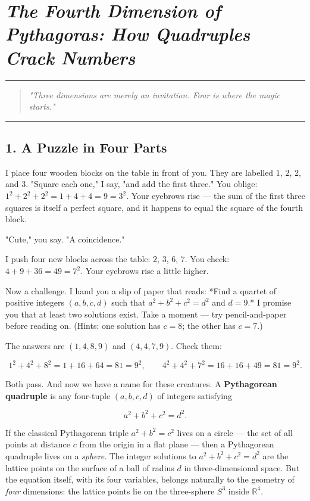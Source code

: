 \documentclass[11pt,openany]{book}
\theoremstyle{definition}
\theoremstyle{plain}
\theoremstyle{remark}
\begin{document}
\clearpage

\chapter{\textit{The Fourth Dimension of Pythagoras: How Quadruples Crack Numbers}}



\bigskip\noindent\rule{\textwidth}{0.4pt}\bigskip


\begin{quote}
\textit{"Three dimensions are merely an invitation. Four is where the magic starts."}
\end{quote}


\bigskip\noindent\rule{\textwidth}{0.4pt}\bigskip


\section{1. A Puzzle in Four Parts}


I place four wooden blocks on the table in front of you. They are labelled $1$, $2$, $2$, and $3$. "Square each one," I say, "and add the first three." You oblige: $1^2 + 2^2 + 2^2 = 1 + 4 + 4 = 9 = 3^2$. Your eyebrows rise — the sum of the first three squares is itself a perfect square, and it happens to equal the square of the fourth block.

"Cute," you say. "A coincidence."

I push four new blocks across the table: $2$, $3$, $6$, $7$. You check: $4 + 9 + 36 = 49 = 7^2$. Your eyebrows rise a little higher.

Now a challenge. I hand you a slip of paper that reads: *Find a quartet of positive integers $(a, b, c, d)$ such that $a^2 + b^2 + c^2 = d^2$ and $d = 9$.* I promise you that at least two solutions exist. Take a moment — try pencil-and-paper before reading on. (Hints: one solution has $c = 8$; the other has $c = 7$.)

The answers are $(1, 4, 8, 9)$ and $(4, 4, 7, 9)$. Check them:

$$1^2 + 4^2 + 8^2 = 1 + 16 + 64 = 81 = 9^2, \qquad 4^2 + 4^2 + 7^2 = 16 + 16 + 49 = 81 = 9^2.$$

Both pass. And now we have a name for these creatures. A \textbf{Pythagorean quadruple} is any four-tuple $(a, b, c, d)$ of integers satisfying

$$a^2 + b^2 + c^2 = d^2.$$

If the classical Pythagorean triple $a^2 + b^2 = c^2$ lives on a circle — the set of all points at distance $c$ from the origin in a flat plane — then a Pythagorean quadruple lives on a \textit{sphere}. The integer solutions to $a^2 + b^2 + c^2 = d^2$ are the lattice points on the surface of a ball of radius $d$ in three-dimensional space. But the equation itself, with its four variables, belongs naturally to the geometry of \textit{four} dimensions: the lattice points lie on the three-sphere $S^3$ inside $\mathbb{R}^4$.
\end{document}

